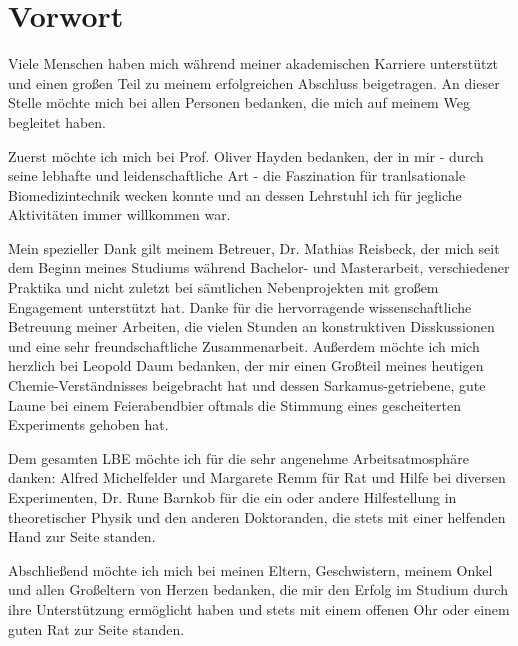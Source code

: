 \chapter*{Vorwort}
\thispagestyle{empty}
Viele Menschen haben mich während meiner akademischen Karriere unterstützt und einen großen Teil zu meinem erfolgreichen Abschluss beigetragen.  An dieser Stelle möchte mich bei allen Personen bedanken, die mich auf meinem Weg begleitet haben.

Zuerst möchte ich mich bei Prof. Oliver Hayden bedanken, der in mir - durch seine lebhafte und leidenschaftliche Art - die Faszination für tranlsationale Biomedizintechnik wecken konnte und an dessen Lehrstuhl ich für jegliche Aktivitäten immer willkommen war.

Mein spezieller Dank gilt meinem Betreuer, Dr. Mathias Reisbeck, der mich seit dem Beginn meines Studiums während Bachelor- und Masterarbeit, verschiedener Praktika und nicht zuletzt bei sämtlichen Nebenprojekten mit großem Engagement unterstützt hat. Danke für die hervorragende wissenschaftliche Betreuung meiner Arbeiten, die vielen Stunden an konstruktiven Disskussionen und eine sehr freundschaftliche Zusammenarbeit. Außerdem möchte ich mich herzlich bei Leopold Daum bedanken, der mir einen Großteil meines heutigen Chemie-Verständnisses beigebracht hat und dessen Sarkamus-getriebene, gute Laune bei einem Feierabendbier oftmals die Stimmung eines gescheiterten Experiments gehoben hat.

Dem gesamten LBE möchte ich für die sehr angenehme Arbeitsatmosphäre danken: Alfred Michelfelder und Margarete Remm für Rat und Hilfe bei diversen Experimenten, Dr. Rune Barnkob für die ein oder andere Hilfestellung in theoretischer Physik und den anderen Doktoranden, die stets mit einer helfenden Hand zur Seite standen.

Abschließend möchte ich mich bei meinen Eltern, Geschwistern, meinem Onkel und allen Großeltern von Herzen bedanken, die mir den Erfolg im Studium durch ihre Unterstützung ermöglicht haben und stets mit einem offenen Ohr oder einem guten Rat zur Seite standen.